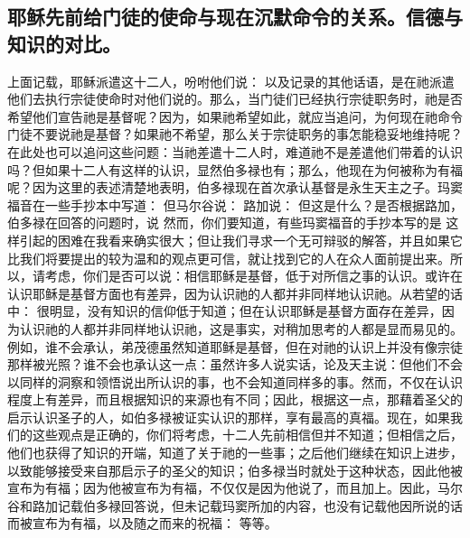
\subsection{耶稣先前给门徒的使命与现在沉默命令的关系。信德与知识的对比。}

 上面记载，耶稣派遣这十二人，吩咐他们说： 以及记录的其他话语，是在祂派遣他们去执行宗徒使命时对他们说的。那么，当门徒们已经执行宗徒职务时，祂是否希望他们宣告祂是基督呢？因为，如果祂希望如此，就应当追问，为何现在祂命令门徒不要说祂是基督？如果祂不希望，那么关于宗徒职务的事怎能稳妥地维持呢？在此处也可以追问这些问题：当祂差遣十二人时，难道祂不是差遣他们带着的认识吗？但如果十二人有这样的认识，显然伯多禄也有；那么，他现在为何被称为有福呢？因为这里的表述清楚地表明，伯多禄现在首次承认基督是永生天主之子。玛窦福音在一些手抄本中写道： 但马尔谷说： 路加说： 但这是什么？是否根据路加，伯多禄在回答的问题时，说 然而，你们要知道，有些玛窦福音的手抄本写的是 这样引起的困难在我看来确实很大；但让我们寻求一个无可辩驳的解答，并且如果它比我们将要提出的较为温和的观点更可信，就让找到它的人在众人面前提出来。所以，请考虑，你们是否可以说：相信耶稣是基督，低于对所信之事的认识。或许在认识耶稣是基督方面也有差异，因为认识祂的人都并非同样地认识祂。从若望的话中： 很明显，没有知识的信仰低于知道；但在认识耶稣是基督方面存在差异，因为认识祂的人都并非同样地认识祂，这是事实，对稍加思考的人都是显而易见的。例如，谁不会承认，弟茂德虽然知道耶稣是基督，但在对祂的认识上并没有像宗徒那样被光照？谁不会也承认这一点：虽然许多人说实话，论及天主说：但他们不会以同样的洞察和领悟说出所认识的事，也不会知道同样多的事。然而，不仅在认识程度上有差异，而且根据知识的来源也有不同；因此，根据这一点，那藉着圣父的启示认识圣子的人，如伯多禄被证实认识的那样，享有最高的真福。现在，如果我们的这些观点是正确的，你们将考虑，十二人先前相信但并不知道；但相信之后，他们也获得了知识的开端，知道了关于祂的一些事；之后他们继续在知识上进步，以致能够接受来自那启示子的圣父的知识；伯多禄当时就处于这种状态，因此他被宣布为有福；因为他被宣布为有福，不仅仅是因为他说了，而且加上。因此，马尔谷和路加记载伯多禄回答说，但未记载玛窦所加的内容，也没有记载他因所说的话而被宣布为有福，以及随之而来的祝福： 等等。\par

